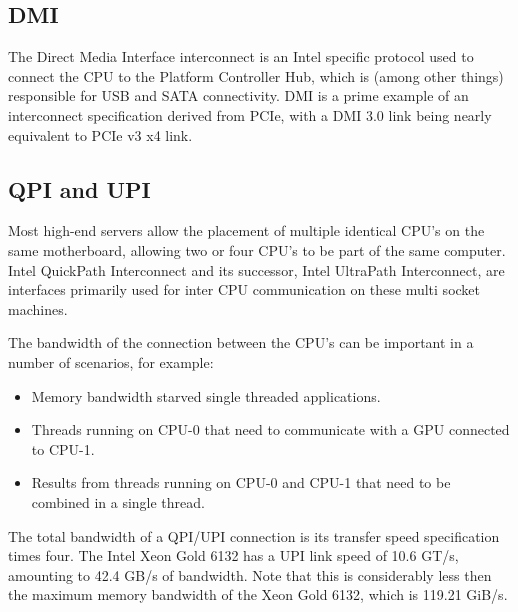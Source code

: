 \subsection*{DMI}

\hspace{4mm}The Direct Media Interface interconnect is an Intel specific protocol used to connect the CPU to the Platform Controller Hub\autocite[]{wiki_pch}, which is (among other things) responsible for USB and SATA connectivity. DMI is a prime example of an interconnect specification derived from PCIe, with a DMI 3.0 link being nearly equivalent to PCIe v3 x4 link.

\newpage

\subsection*{QPI and UPI}

\hspace{4mm}Most high-end servers allow the placement of multiple identical CPU's on the same motherboard, allowing two or four CPU's to be part of the same computer. Intel QuickPath Interconnect\autocite[]{wiki_qpi} and its successor, Intel UltraPath Interconnect\autocite[]{wiki_upi}, are interfaces primarily used for inter CPU communication on these multi socket machines\vspace{5mm}.

\noindent The bandwidth of the connection between the CPU's can be important in a number of scenarios, for example:

\begin{itemize}
    \item Memory bandwidth starved single threaded applications.
    \item Threads running on CPU-0 that need to communicate with a GPU connected to CPU-1.
    \item Results from threads running on CPU-0 and CPU-1 that need to be combined in a single thread.
\end{itemize}

The total bandwidth of a QPI/UPI connection is its transfer speed specification times four. The Intel Xeon Gold 6132 has a UPI link speed of 10.6 GT/s, amounting to 42.4 GB/s of bandwidth. Note that this is considerably less then the maximum memory bandwidth of the Xeon Gold 6132, which is 119.21 GiB/s.